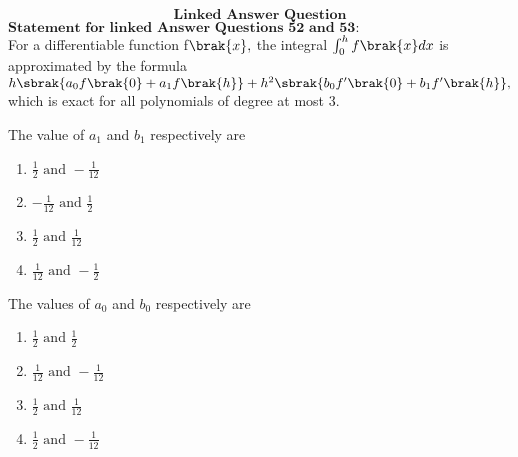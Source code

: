 \bigskip
$$\textbf{Linked Answer Question}$$
$\textbf{Statement for linked Answer Questions 52 and 53:}$\\
For a differentiable function f$\brak{x},$ the integral $\int_{0}^{h}f\brak{x}dx$ is approximated by the formula $h\sbrak{a_{0}f\brak{0}+a_{1}f\brak{h}}+h^{2}\sbrak{b_{0}f^{\prime}\brak{0}+b_{1}f^{\prime}\brak{h}},$ which is exact for all polynomials of degree at most 3.\bigskip
\item The value of $a_{1}$ and $b_{1}$ respectively are 
\begin{multicols}{4}
    \begin{enumerate}
        \item $\frac{1}{2} \text{ and } -\frac{1}{12}$
        \item $-\frac{1}{12} \text{ and } \frac{1}{2}$ 
        \item$\frac{1}{2} \text{ and } \frac{1}{12}$
        \item$\frac{1}{12} \text{ and } -\frac{1}{2}$
    \end{enumerate}
\end{multicols}
\bigskip
\item The values of $a_{0}$ and $b_{0}$ respectively  are 
\begin{multicols}{4}
    \begin{enumerate}
        \item $\frac{1}{2} \text{ and } \frac{1}{2}$
        \item $\frac{1}{12} \text{ and } -\frac{1}{12}$ 
        \item$\frac{1}{2} \text{ and } \frac{1}{12}$
        \item$\frac{1}{2} \text{ and } -\frac{1}{12}$
    \end{enumerate}
\end{multicols}



